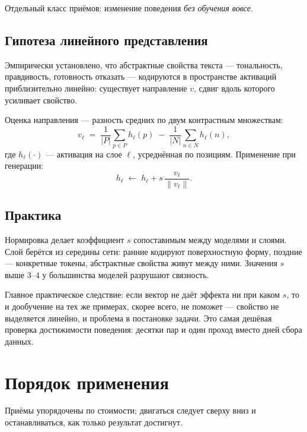\documentclass[11pt,a4paper]{article}
\begin{document}
Отдельный класс приёмов: изменение поведения \emph{без обучения вовсе}.

\subsection{Гипотеза линейного представления}

Эмпирически установлено, что абстрактные свойства текста — тональность,
правдивость, готовность отказать — кодируются в пространстве активаций
приблизительно линейно: существует направление $v$, сдвиг вдоль которого
усиливает свойство.

Оценка направления — разность средних по двум контрастным множествам:
\[
v_\ell \;=\; \frac{1}{|P|}\sum_{p\in P} h_\ell(p)
\;-\;\frac{1}{|N|}\sum_{n\in N} h_\ell(n),
\]
где $h_\ell(\cdot)$ — активация на слое $\ell$, усреднённая по позициям.
Применение при генерации:
\[
h_\ell \;\leftarrow\; h_\ell + s\,\frac{v_\ell}{\lVert v_\ell\rVert}.
\]

\subsection{Практика}

Нормировка делает коэффициент $s$ сопоставимым между моделями и слоями.
Слой берётся из середины сети: ранние кодируют поверхностную форму,
поздние — конкретные токены, абстрактные свойства живут между ними.
Значения $s$ выше 3--4 у большинства моделей разрушают связность.

\begin{keybox}
Главное практическое следствие: если вектор не даёт эффекта ни при каком
$s$, то и дообучение на тех же примерах, скорее всего, не поможет —
свойство не выделяется линейно, и проблема в постановке задачи. Это
самая дешёвая проверка достижимости поведения: десятки пар и один проход
вместо дней сбора данных.
\end{keybox}

\section{Порядок применения}

Приёмы упорядочены по стоимости; двигаться следует сверху вниз
и останавливаться, как только результат достигнут.
\end{document}
